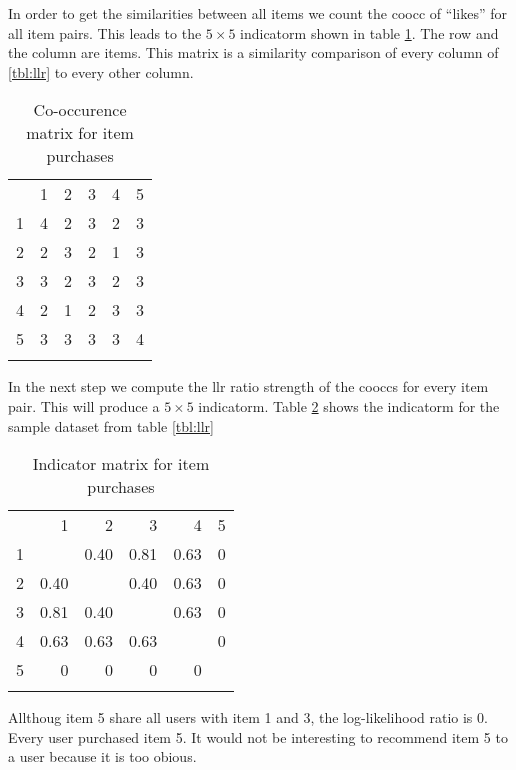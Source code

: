In order to get the similarities between all items we count the \gls{coocc} of ``\glspl{like}'' for all item pairs. This leads to the $5 \times 5$ \gls{indicatorm} shown in table \ref{tab:cooccurencematrix}. The row and the column are items. This matrix is a similarity comparison of every column of \ref{tbl:llr} to every other column.

\begin{table}
  \centering
\begin{center}
\begin{tabular}{rrrrrr}
  & 1 & 2 & 3 & 4 & 5\\
1 & 4 & 2 & 3 & 2 & 3\\
2 & 2 & 3 & 2 & 1 & 3\\
3 & 3 & 2 & 3 & 2 & 3\\
4 & 2 & 1 & 2 & 3 & 3\\
5 & 3 & 3 & 3 & 3 & 4\\
 &  &  &  &  & \\
\end{tabular}
\end{center}
  \caption{Co-occurence matrix for item purchases}
  \label{tab:cooccurencematrix}
\end{table}

In the next step we compute the \gls{llr} ratio strength of the \glspl{coocc} for every item pair. This will produce a $5 \times 5$ \gls{indicatorm}. Table \ref{tab:indicatormatrix} shows the \gls{indicatorm} for the sample dataset from table \ref{tbl:llr}

\begin{table}
  \centering
\begin{center}
\begin{tabular}{rrrrrr}
  & 1 & 2 & 3 & 4 & 5\\
1 &   & 0.40 & 0.81 & 0.63 & 0\\
2 & 0.40 &  & 0.40 & 0.63 & 0\\
3 & 0.81 & 0.40 &  & 0.63 & 0\\
4 & 0.63 & 0.63 & 0.63 &  & 0\\
5 & 0 & 0 & 0 & 0 & \\
 &  &  &  &  & \\
\end{tabular}
\end{center}
  \caption{Indicator matrix for item purchases}
  \label{tab:indicatormatrix}
\end{table}

Allthoug item 5 share all users with item 1 and 3, the log-likelihood ratio is 0. Every user purchased item 5. It would not be interesting to recommend item 5 to a user because it is too obious.


